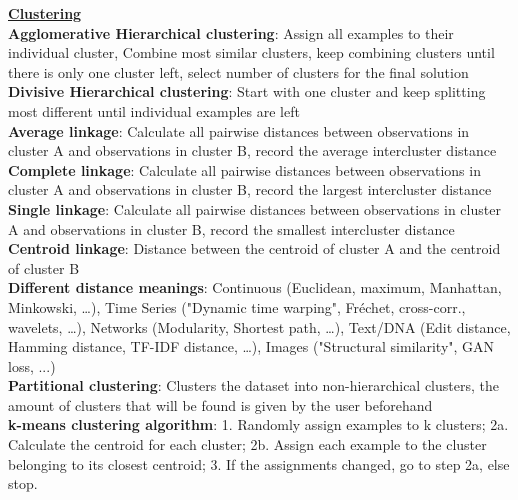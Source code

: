 \documentclass[a4paper,7pt,landscape]{extarticle}
\begin{document}
\begin{multicols}{3}
\begin{boxA}
\underline{\textbf{Clustering}}\\
\textbf{Agglomerative Hierarchical clustering}: Assign all examples to their individual cluster, Combine most similar clusters, keep combining clusters until there is only one cluster left, select number of clusters for the final solution\\
\textbf{Divisive Hierarchical clustering}: Start with one cluster and keep splitting most different until individual examples are left\\
\textbf{Average linkage}: Calculate all pairwise distances between observations in cluster A and observations in cluster B, record the average intercluster distance\\
\textbf{Complete linkage}: Calculate all pairwise distances between observations in cluster A and observations in cluster B, record the largest intercluster distance\\
\textbf{Single linkage}: Calculate all pairwise distances between observations in cluster A and observations in cluster B, record the smallest intercluster distance\\
\textbf{Centroid linkage}: Distance between the centroid of cluster A and the centroid of cluster B\\
\textbf{Different distance meanings}: Continuous (Euclidean, maximum, Manhattan, Minkowski, …), Time Series ("Dynamic time warping", Fréchet, cross-corr., wavelets, …), Networks (Modularity, Shortest path, …), Text/DNA (Edit distance, Hamming distance, TF-IDF distance, …), Images ("Structural similarity", GAN loss, ...)\\
\textbf{Partitional clustering}: Clusters the dataset into non-hierarchical clusters, the amount of clusters that will be found is given by the user beforehand\\
\textbf{k-means clustering algorithm}: 1. Randomly assign examples to k clusters; 2a. Calculate the centroid for each cluster; 2b. Assign each example to the cluster belonging to its closest centroid; 3. If the assignments changed, go to step 2a, else stop.
\end{boxA}


\end{multicols}
\end{document}
